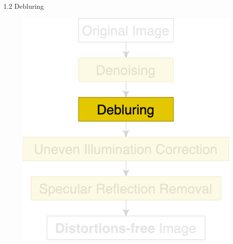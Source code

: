 \documentclass{libs/ufc_format}
\begin{document}
\begin{frame}{ 1.2 Debluring}
    \begin{figure}
        \includegraphics[scale=0.25]{libs/stage1.2.png}
    \end{figure}
\end{frame}
\end{document}
